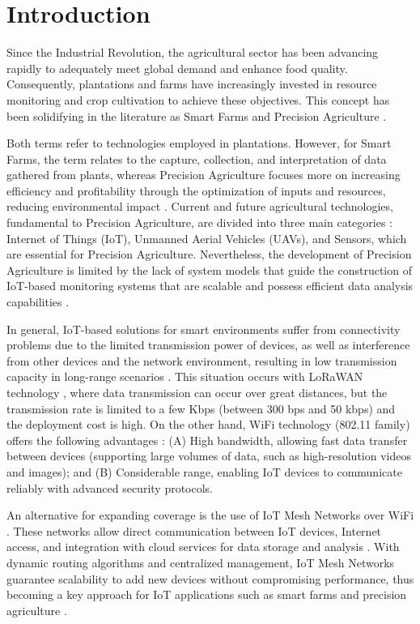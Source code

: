 \documentclass[journal]{IEEEtran}
\begin{document}
\section{Introduction}

Since the Industrial Revolution, the agricultural sector has been advancing rapidly to adequately meet global demand and enhance food quality. Consequently, plantations and farms have increasingly invested in resource monitoring and crop cultivation to achieve these objectives. This concept has been solidifying in the literature as Smart Farms and Precision Agriculture \cite{karunathilake2023path}.

Both terms refer to technologies employed in plantations. However, for Smart Farms, the term relates to the capture, collection, and interpretation of data gathered from plants, whereas Precision Agriculture focuses more on increasing efficiency and profitability through the optimization of inputs and resources, reducing environmental impact \cite{prakash2023advancements}. Current and future agricultural technologies, fundamental to Precision Agriculture, are divided into three main categories \cite{8804834}: Internet of Things (IoT), Unmanned Aerial Vehicles (UAVs), and Sensors, which are essential for Precision Agriculture. Nevertheless, the development of Precision Agriculture is limited by the lack of system models that guide the construction of IoT-based monitoring systems that are scalable and possess efficient data analysis capabilities \cite{karunathilake2023path}.

In general, IoT-based solutions for smart environments suffer from connectivity problems due to the limited transmission power of devices, as well as interference from other devices and the network environment, resulting in low transmission capacity in long-range scenarios \cite{Brito-LNet-2026}. This situation occurs with LoRaWAN technology \cite{czeczot2023analysis}, where data transmission can occur over great distances, but the transmission rate is limited to a few Kbps (between 300 bps and 50 kbps) and the deployment cost is high. On the other hand, WiFi technology (802.11 family) offers the following advantages \cite{IJES-2022-129802}: (A) High bandwidth, allowing fast data transfer between devices (supporting large volumes of data, such as high-resolution videos and images); and (B) Considerable range, enabling IoT devices to communicate reliably with advanced security protocols.

An alternative for expanding coverage is the use of IoT Mesh Networks over WiFi \cite{morman2023iot}. These networks allow direct communication between IoT devices, Internet access, and integration with cloud services for data storage and analysis \cite{10-1145-1858477-1858479, gomes2011using}. With dynamic routing algorithms and centralized management, IoT Mesh Networks guarantee scalability to add new devices without compromising performance, thus becoming a key approach for IoT applications such as smart farms and precision agriculture \cite{10-1007-978-3-642-13789-1_1,gaikwad2023wireless}.
\end{document}
